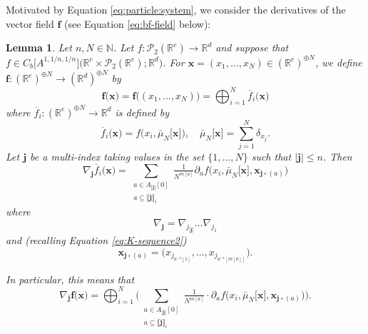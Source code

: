 \documentclass[a4paper,11pt,twoside]{article}
\numberwithin{equation}{section}
\theoremstyle{plain}
\newtheorem{lemma}[theorem]{Lemma}
\newcommand{\bN}{\mathbb{N}}
\newcommand{\bR}{\mathbb{R}}
\newcommand{\cP}{\mathcal{P}}
\newcommand{\1}{\mathbbm{1}}
\begin{document}
	Motivated by Equation \eqref{eq:particle:system}, we consider the derivatives of the vector field $\boldsymbol{f}$ (see Equation \eqref{eq:bf-field} below):
	\begin{lemma}
		\label{lemma:Empirical-nDeriv-fullsystem}
		Let $n, N\in \bN$. Let $f: \cP_2(\bR^e) \to \bR^d$ and suppose that $f\in C_b\big[ A^{1, 1/n, 1/n} \big] \big( \bR^e \times \cP_2(\bR^e); \bR^d \big)$. For $\boldsymbol{x} = (x_1, ..., x_N) \in (\bR^e)^{\oplus N}$, we define $\boldsymbol{f}: (\bR^e)^{\oplus N} \to (\bR^d)^{\oplus N}$ by
		\begin{equation}
			\label{eq:bf-field}
			\boldsymbol{f}\Big( \boldsymbol{x} \Big) = \boldsymbol{f}\Big( (x_1, ..., x_N) \Big) = \bigoplus_{i=1}^N \overline{f}_i \Big( \boldsymbol{x} \Big)
		\end{equation}
		where $\overline{f}_i: (\bR^e)^{\oplus N} \to \bR^d$ is defined by
		\begin{equation*}
			\overline{f}_i \Big( \boldsymbol{x} \Big) = f\Big( x_i, \bar{\mu}_N\big[ \boldsymbol{x} \big] \Big), \quad \bar{\mu}_N\big[ \boldsymbol{x} \big] = \sum_{j=1}^N \delta_{x_j}. 
		\end{equation*}
		Let $\boldsymbol{j}$ be a multi-index taking values in the set $\{1, ..., N\}$ such that $|\boldsymbol{j}|\leq n$. Then
		\begin{equation}
			\label{eq:lemma:Empirical-nDeriv-fullsystem*}
			\nabla_{\boldsymbol{j}} \overline{f}_i \Big( \boldsymbol{x} \Big) 
			= 
			\sum_{\substack{a \in A_{|\boldsymbol{j}|}[0] \\ a\subseteq \llbracket \boldsymbol{j}\rrbracket_i }} \tfrac{1}{N^{m[a]}} \partial_a f \Big( x_i, \bar{\mu}_N\big[ \boldsymbol{x} \big], \boldsymbol{x}_{\boldsymbol{j}\circ(a)} \Big) 
		\end{equation}
		where 
		\begin{equation*}
			\nabla_{\boldsymbol{j}} = \nabla_{j_{|\boldsymbol{j}|}} ... \nabla_{j_1}
		\end{equation*}
		and (recalling Equation \eqref{eq:K-sequence2})
		\begin{equation*}
			\boldsymbol{x}_{\boldsymbol{j}\circ(a)} = \Big( x_{j_{a^{-1}[1]}}, ..., x_{j_{a^{-1}[m[a]]}} \Big). 
		\end{equation*}
		
		In particular, this means that
		\begin{equation}
			\label{eq:lemma:Empirical-nDeriv-fullsystem}
			\nabla_{\boldsymbol{j}} \boldsymbol{f} \Big( \boldsymbol{x} \Big) = \bigoplus_{i=1}^N \bigg( \sum_{\substack{a \in A_{|\boldsymbol{j}|}[0] \\ a\subseteq \llbracket \boldsymbol{j} \rrbracket_i }} \tfrac{1}{N^{m[a]}} \cdot \partial_a f \Big( x_i, \bar{\mu}_N\big[ \boldsymbol{x} \big], \boldsymbol{x}_{\boldsymbol{j}\circ(a)} \Big) \bigg). 
		\end{equation}
	\end{lemma}
	
\end{document}
